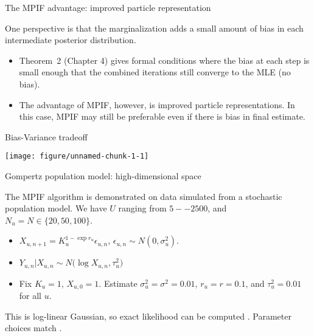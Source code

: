 \documentclass[aspectratio=169]{beamer}\usepackage[]{graphicx}\usepackage[]{xcolor}
\makeatletter
\def\maxwidth{ %
  \ifdim\Gin@nat@width>\linewidth
    \linewidth
  \else
    \Gin@nat@width
  \fi
}
\newenvironment{knitrout}{}{} %
\makeatother
\begin{document}
\begin{frame}{The MPIF advantage: improved particle representation}

  One perspective is that the marginalization adds a small amount of bias in each intermediate posterior distribution.
  
  \begin{itemize}
    \item Theorem~2 (Chapter 4) gives formal conditions where the bias at each step is small enough that the combined iterations still converge to the MLE (no bias).
    \item The advantage of MPIF, however, is improved particle representations. In this case, MPIF may still be preferable even if there is bias in final estimate.
  \end{itemize}
  
\end{frame}

\begin{frame}{Bias-Variance tradeoff}
  
\begin{knitrout}
\color{fgcolor}

{\centering \texttt{[image: figure/unnamed-chunk-1-1]} 

}


\end{knitrout}
  
\end{frame}

\begin{frame}{Gompertz population model: high-dimensional space}

The MPIF algorithm is demonstrated on data simulated from a stochastic population model. We have $U$ ranging from $5--2500$, and $N_u = N \in \{20, 50, 100\}$.
\begin{itemize}
  \item $X_{u, n+1} = K^{1- \exp{r_u}}_u \epsilon_{u, n}$, $\epsilon_{u, n} \sim N(0, \sigma^2_u)$. 
  \item $Y_{u, n} | X_{u, n} \sim N\big(\log X_{u, n}, \tau^2_u\big)$
  \item Fix $K_u = 1$, $X_{u, 0} = 1$. Estimate $\sigma_u^2 = \sigma^2 = 0.01$, $r_u = r = 0.1$, and $\tau_u^2 = 0.01$ for all $u$.  
\end{itemize}

This is log-linear Gaussian, so exact likelihood can be computed \citep{kalman60}. Parameter choices match \citet{breto20}. 

\end{frame}
\end{document}
